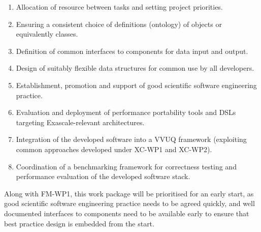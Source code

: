 \liststyleWWNumxii
\begin{enumerate}
\item Allocation of resource between tasks and setting project priorities.
\item Ensuring a consistent choice of definitions (ontology) of objects or 
equivalently classes.
\item Definition of common interfaces to components for data input and output. 
\item Design of suitably flexible data structures for common use by all 
developers.
\item Establishment, promotion and support of good scientific software 
engineering practice.
\item Evaluation and deployment of performance portability tools and DSLs 
targeting Exascale-relevant architectures.
\item Integration of the developed software into a VVUQ framework (exploiting 
common approaches developed under XC-WP1
and XC-WP2).
\item Coordination of a benchmarking framework for correctness testing and 
performance evaluation of the developed
software stack.
\end{enumerate}

\bigskip

Along with FM-WP1, this work package will be prioritised for an early start, as 
good scientific software engineering
practice needs to be agreed quickly, and well documented interfaces to 
components need to be available early to ensure
that best practice design is embedded from the start.

